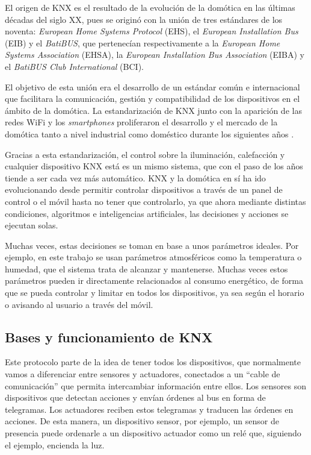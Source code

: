 El origen de KNX es el resultado de la evolución de la domótica en las últimas décadas del siglo XX, pues se originó con la unión de tres estándares de los noventa: \textit{European Home Systems Protocol} (EHS), el \textit{European Installation Bus} (EIB) y el \textit{BatiBUS}, que pertenecían respectivamente a la \textit{European Home Systems Association} (EHSA), la \textit{European Installation Bus Association} (EIBA) y el \textit{BatiBUS Club International} (BCI).

El objetivo de esta unión era el desarrollo de un estándar común e internacional que facilitara la comunicación, gestión y compatibilidad de los dispositivos en el ámbito de la domótica. La estandarización de KNX junto con la aparición de las redes WiFi y los \textit{smartphones} proliferaron el desarrollo y el mercado de la domótica tanto a nivel industrial como doméstico durante los siguientes años \cite{intro_5}.

Gracias a esta estandarización, el control sobre la iluminación, calefacción y cualquier dispositivo KNX está es un mismo sistema, que con el paso de los años tiende a ser cada vez más automático. KNX y la domótica en sí ha ido evolucionando desde permitir controlar dispositivos a través de un panel de control o el móvil hasta no tener que controlarlo, ya que ahora mediante distintas condiciones, algoritmos e inteligencias artificiales, las decisiones y acciones se ejecutan solas.

Muchas veces, estas decisiones se toman en base a unos parámetros ideales. Por ejemplo, en este trabajo se usan parámetros atmosféricos como la temperatura o humedad, que el sistema trata de alcanzar y mantenerse. Muchas veces estos parámetros pueden ir directamente relacionados al consumo energético, de forma que se pueda controlar y limitar en todos los dispositivos, ya sea según el horario o avisando al usuario a través del móvil.

\subsection{Bases y funcionamiento de KNX}

Este protocolo parte de la idea de tener todos los dispositivos, que normalmente vamos a diferenciar entre sensores y actuadores, conectados a un “cable de comunicación” que permita intercambiar información entre ellos. Los sensores son dispositivos que detectan acciones y envían órdenes al bus en forma de telegramas. Los actuadores reciben estos telegramas y traducen las órdenes en acciones. De esta manera, un dispositivo sensor, por ejemplo, un sensor de presencia puede ordenarle a un dispositivo actuador como un relé que, siguiendo el ejemplo, encienda la luz.


